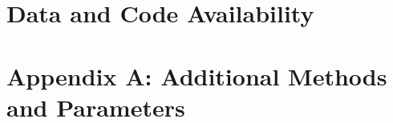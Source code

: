 \documentclass[11pt]{article}
\begin{document}
\section*{Data and Code Availability}
 

\section*{Appendix A: Additional Methods and Parameters}

%
%
%
%

\renewcommand{\theequation}{A\arabic{equation}}
\renewcommand{\thetable}{A\arabic{table}}
\setcounter{equation}{0}  %
\setcounter{figure}{0}
\setcounter{table}{0}
\end{document}
